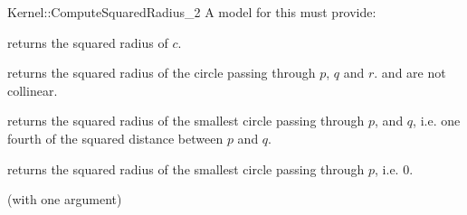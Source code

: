 \begin{ccRefFunctionObjectConcept}{Kernel::ComputeSquaredRadius_2}
A model for this must provide:


       {returns the squared radius of $c$. }

       {returns the squared radius of the circle passing through $p$, $q$
       and $r$. \ccPrecond {} and  are not collinear.}

{returns the squared radius of the smallest circle passing through $p$,
and $q$, i.e. one fourth of the squared distance between $p$ and $q$.}

{returns the squared radius of the smallest circle passing through $p$, i.e. $0$.}

\ccRefines
{} (with one argument)

\ccSeeAlso
{} \\
  \\

\end{ccRefFunctionObjectConcept}

